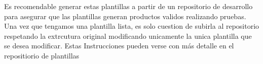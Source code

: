 \documentclass[12pt, a4paper, twoside]{article}
\begin{document}
\begin{umaappendices}
	Es recomendable generar estas plantillas a partir de un repositorio de desarrollo \cite{dockerfile_template_dev} para asegurar que las plantillas generan productos validos realizando pruebas.
	Una vez que tengamos una plantilla lista, es solo cuestion de subirla al repositorio respetando la extrcutura original modificando unicamente la unica plantilla que se desea modificar.
	Estas Instrucciones pueden verse con más detalle en el repositiorio de plantillas \cite{m4rdom_templates}




\end{umaappendices}


\end{document}

